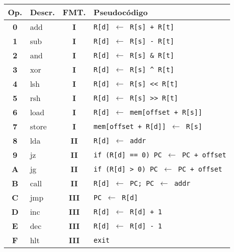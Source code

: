 \documentclass[12pt,a4paper]{article}
\begin{document}
\begin{center}
\begin{minipage}{.1\textwidth}
\begin{footnotesize}
\begin{tabbing}
\end{tabbing}
\end{footnotesize}
\end{minipage}
\quad%
\begin{minipage}{.7\textwidth}
\begin{center}
	\begin{small} %
	\begin{tabular}{|c|l|c|l|}\hline
	\textsf{Op.} &
	\textsf{Descr.} &
	\textsf{FMT.} &
	\textsf{Pseudoc\'odigo} \\ \hline
	\textbf{0} & \textsf{add}   & \textbf{I}   & \texttt{R[d] $\leftarrow$ R[s] + R[t]} \\
	\textbf{1} & \textsf{sub}   & \textbf{I}   & \texttt{R[d] $\leftarrow$ R[s] - R[t]} \\
	\textbf{2} & \textsf{and}   & \textbf{I}   & \texttt{R[d] $\leftarrow$ R[s] \& R[t]} \\
	\textbf{3} & \textsf{xor}   & \textbf{I}   & \texttt{R[d] $\leftarrow$ R[s] \^{} R[t]} \\
	\textbf{4} & \textsf{lsh}   & \textbf{I}   & \texttt{R[d] $\leftarrow$ R[s] <{}<{} R[t]} \\
	\textbf{5} & \textsf{rsh}   & \textbf{I}   & \texttt{R[d] $\leftarrow$ R[s] >{}>{} R[t]} \\
	\textbf{6} & \textsf{load}  & \textbf{I}   & \texttt{R[d] $\leftarrow$ mem[offset + R[s]]} \\
	\textbf{7} & \textsf{store} & \textbf{I}   & \texttt{mem[offset + R[d]] $\leftarrow$ R[s]} \\
	\textbf{8} & \textsf{lda}   & \textbf{II}  & \texttt{R[d] $\leftarrow$ addr} \\
	\textbf{9} & \textsf{jz}    & \textbf{II}  & \texttt{if (R[d] == 0) PC $\leftarrow$ PC + offset} \\
	\textbf{A} & \textsf{jg}    & \textbf{II}  & \texttt{if (R[d] >{} 0) PC $\leftarrow$ PC + offset} \\
	\textbf{B} & \textsf{call}  & \textbf{II}  & \texttt{R[d] $\leftarrow$ PC; PC $\leftarrow$ addr} \\
	\textbf{C} & \textsf{jmp}   & \textbf{III} & \texttt{PC $\leftarrow$ R[d]} \\
	\textbf{D} & \textsf{inc}   & \textbf{III} & \texttt{R[d] $\leftarrow$ R[d] + 1} \\
	\textbf{E} & \textsf{dec}   & \textbf{III} & \texttt{R[d] $\leftarrow$ R[d] - 1} \\
	\textbf{F} & \textsf{hlt}   & \textbf{III} & \texttt{exit} \\ \hline
	\end{tabular}
	\end{small}
	

\end{center}
\end{minipage}
\end{center}
\end{document}
